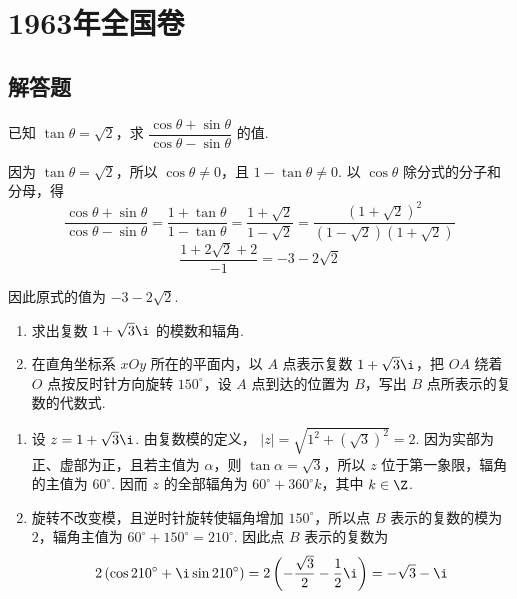 
\chapter{1963年全国卷}

\section{解答题}

\begin{problem}
已知 \(\tan\theta=\sqrt2\)，求 \(\dfrac{\cos\theta+\sin\theta}{\cos\theta-\sin\theta}\) 的值.
\end{problem}

\begin{solution}
因为 \(\tan\theta=\sqrt2\)，所以 \(\cos\theta\neq0\)，且 \(1-\tan\theta\neq0\). 以 \(\cos\theta\) 除分式的分子和分母，得
\[
\frac{\cos\theta+\sin\theta}{\cos\theta-\sin\theta}
=\frac{1+\tan\theta}{1-\tan\theta}
=\frac{1+\sqrt2}{1-\sqrt2}
=\frac{\left( 1+\sqrt2 \right)^2}{\left( 1-\sqrt2 \right)\left( 1+\sqrt2 \right)}
\]
\[
\frac{1+2\sqrt2+2}{-1}=-3-2\sqrt2
\]

因此原式的值为 \(-3-2\sqrt2\).
\end{solution}

\begin{problem}
\begin{enumerate}
\item 求出复数 \(1+\sqrt3\i\) 的模数和辐角.
\item 在直角坐标系 \(xOy\) 所在的平面内，以 \(A\) 点表示复数 \(1+\sqrt3\i\)，把 \(OA\) 绕着 \(O\) 点按反时针方向旋转 \(150^\circ\)，设 \(A\) 点到达的位置为 \(B\)，写出 \(B\) 点所表示的复数的代数式.
\end{enumerate}
\end{problem}

\begin{solution}
\begin{enumerate}
\item 设 \(z=1+\sqrt3\i\). 由复数模的定义，
\(|z|=\sqrt{1^2+\left(\sqrt3\right)^2}=2\).
因为实部为正、虚部为正，且若主值为 \(\alpha\)，则 \(\tan\alpha=\sqrt3\)，所以 \(z\) 位于第一象限，辐角的主值为 \(60^\circ\). 因而 \(z\) 的全部辐角为 \(60^\circ+360^\circ k\)，其中 \(k\in\Z\).

\item 旋转不改变模，且逆时针旋转使辐角增加 \(150^\circ\)，所以点 \(B\) 表示的复数的模为 \(2\)，辐角主值为
\(60^\circ+150^\circ=210^\circ\).
因此点 \(B\) 表示的复数为
\[
2\left(\cos210^\circ+\i\sin210^\circ\right)
=2\left(-\frac{\sqrt3}{2}-\frac12\i\right)
=-\sqrt3-\i
\]

\end{enumerate}
\end{solution}

